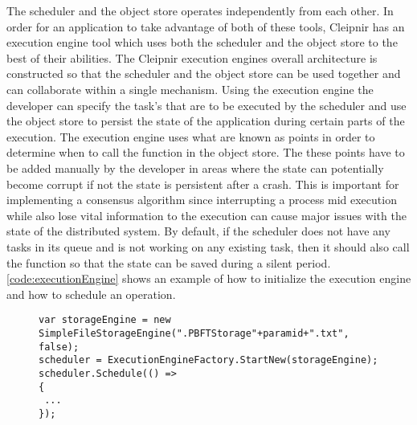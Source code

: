 The scheduler and the object store operates independently from each other. In order for an application to take advantage of both of these tools, Cleipnir has an execution engine tool which uses both the scheduler and the object store to the best of their abilities.
The Cleipnir execution engines overall architecture is constructed so that the scheduler and the object store can be used together and can collaborate within a single mechanism. Using the execution engine the developer can specify the task's that are to be executed by the scheduler and use the object store to persist the state of the application during certain parts of the execution. The execution engine uses what are known as  points in order to determine when to call the  function in the object store. The these points have to be added manually by the developer in areas where the state can potentially become corrupt if not the state is persistent after a crash. This is important for implementing a consensus algorithm since interrupting a process mid execution while also lose vital information to the execution can cause major issues with the state of the distributed system. By default, if the scheduler does not have any tasks in its queue and is not working on any existing task, then it should also call the  function so that the state can be saved during a silent period. \autoref{code:executionEngine} shows an example of how to initialize the execution engine and how to schedule an operation\cite[p.~11]{PAPER:PaxosCleipnir}.

\begin{figure}[H]
	\centering
	\lstset{style=sharpc}
	\begin{lstlisting}[label = code:executionEngine, caption=Execution engine example, captionpos=b, basicstyle=\scriptsize]
var storageEngine = new SimpleFileStorageEngine(".PBFTStorage"+paramid+".txt", false);
scheduler = ExecutionEngineFactory.StartNew(storageEngine);
scheduler.Schedule(() => 
{
 ...
});
	\end{lstlisting}
\end{figure}

